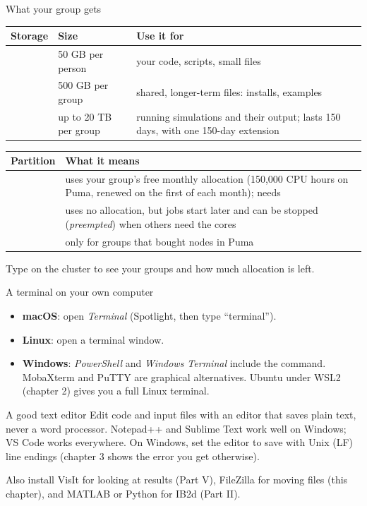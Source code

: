 \documentclass[aspectratio=169,11pt]{beamer}
\begin{document}
\begin{frame}{What your group gets}
\small
\begin{tabular}{@{}L{0.20\textwidth}L{0.24\textwidth}L{0.50\textwidth}@{}}
\toprule
Storage & Size & Use it for \\
\midrule
{} & 50 GB per person & your code, scripts, small files \\
 & 500 GB per group & shared, longer-term files: installs, examples \\
 & up to 20 TB per group & running simulations and their output; lasts 150 days, with one 150-day extension \\
\bottomrule
\end{tabular}
\vspace{3mm}

\begin{tabular}{@{}L{0.20\textwidth}L{0.74\textwidth}@{}}
\toprule
Partition & What it means \\
\midrule
{} & uses your group's free monthly allocation (150{,}000 CPU hours on Puma, renewed on the first of each month); needs  \\
 & uses no allocation, but jobs start later and can be stopped (\emph{preempted}) when others need the cores \\
 & only for groups that bought nodes in Puma \\
\bottomrule
\end{tabular}
\vspace{2mm}

Type  on the cluster to see your groups and how much allocation is left.
\end{frame}

\begin{frame}{A terminal on your own computer}
\begin{itemize}
  \item \textbf{macOS}: open \emph{Terminal} (Spotlight, then type ``terminal'').
  \item \textbf{Linux}: open a terminal window.
  \item \textbf{Windows}: \emph{PowerShell} and \emph{Windows Terminal} include the  command. MobaXterm and PuTTY are graphical alternatives. Ubuntu under WSL2 (chapter 2) gives you a full Linux terminal.
\end{itemize}
\vspace{2mm}
\begin{block}{A good text editor}
\small Edit code and input files with an editor that saves plain text, never a word processor. Notepad++ and Sublime Text work well on Windows; VS Code works everywhere. On Windows, set the editor to save with Unix (LF) line endings (chapter 3 shows the error you get otherwise).
\end{block}
\begin{block}{Also install}
\small VisIt for looking at results (Part V), FileZilla for moving files (this chapter), and MATLAB or Python for IB2d (Part II).
\end{block}
\end{frame}
\end{document}
